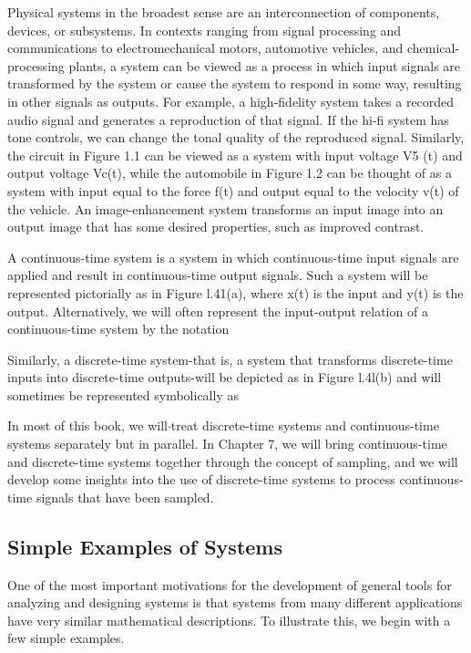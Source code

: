 \documentclass{report}
\begin{document}
Physical systems in the broadest sense are an interconnection of components, devices, or subsystems. In contexts ranging from signal processing and
communications to electromechanical motors, automotive vehicles, and chemical-processing plants, a system can be viewed as a process in which input
signals are transformed by the system or cause the system to respond in some way, resulting in other signals as outputs. For example, a high-fidelity
system takes a recorded audio signal and generates a reproduction of that signal. If the hi-fi system has tone controls, we can change the tonal
quality of the reproduced signal. Similarly, the circuit in Figure 1.1 can be viewed as a system with input voltage V5 (t) and output voltage Vc(t),
while the automobile in Figure 1.2 can be thought of as a system with input equal to the force f(t) and output equal to the velocity v(t) of the
vehicle. An image-enhancement system transforms an input image into an output image that has some desired properties, such as improved contrast.

A continuous-time system is a system in which continuous-time input signals are applied and result in continuous-time output signals. Such a system
will be represented pictorially as in Figure l.41(a), where x(t) is the input and y(t) is the output. Alternatively, we will often represent the
input-output relation of a continuous-time system by the notation

Similarly, a discrete-time system-that is, a system that transforms discrete-time inputs into discrete-time outputs-will be depicted as in Figure
l.4l(b) and will sometimes be represented symbolically as



In most of this book, we will$\cdot $treat discrete-time systems and continuous-time systems separately but in parallel. In Chapter 7, we will bring
continuous-time and discrete-time systems together through the concept of sampling, and we will develop some insights into the use of discrete-time
systems to process continuous-time signals that have been sampled.

\subsection*{Simple Examples of Systems}

One of the most important motivations for the development of general tools for analyzing and designing systems is that systems from many different
applications have very similar mathematical descriptions. To illustrate this, we begin with a few simple examples.
\end{document}
